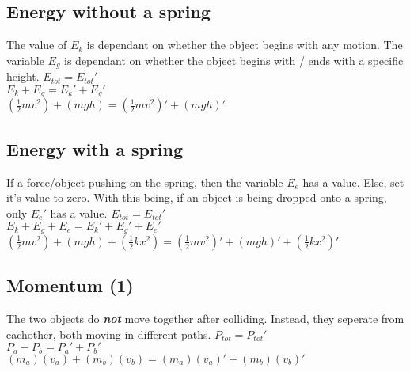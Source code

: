 \begin{adjustwidth}{1cm}{0pt}
    \subsection{Energy without a spring}
    \begin{flushleft}
        The value of $E_{k}$ is dependant on whether the object begins with any motion. The variable $E_{g}$ is dependant on whether the object begins with / ends with a specific height.\newline\newline
        $E_{tot} = E_{tot}\prime$ \\
        \vspace*{10pt}
        $E_{k} + E_{g} = E_{k}\prime + E_{g}\prime$ \\
        \vspace*{10pt}
        $(\frac{1}{2}mv^2) + (mgh) = (\frac{1}{2}mv^2)\prime + (mgh)\prime$
    \end{flushleft}
    \subsection{Energy with a spring}
    \begin{flushleft}
        If a force/object pushing on the spring, then the variable $E_{e}$ has a value. Else, set it's value to zero. With this being, if an object is being dropped onto a spring, only $E_{e}\prime$ has a value.\newline\newline
        $E_{tot} = E_{tot}\prime$ \\
        \vspace*{10pt}
        $E_{k} + E_{g} + E_{e} = E_{k}\prime + E_{g}\prime + E_{e}\prime$ \\
        \vspace*{10pt}
        $(\frac{1}{2}mv^2) + (mgh) + (\frac{1}{2}kx^2) = (\frac{1}{2}mv^2)\prime + (mgh)\prime + (\frac{1}{2}kx^2)\prime$
    \end{flushleft}
    \subsection{Momentum (1)}
    \begin{flushleft}
        The two objects do \textbf{\textit{not}} move together after colliding. Instead, they seperate from eachother, both moving in different paths.\newline\newline
        $P_{tot} = P_{tot}\prime$ \\
        \vspace*{10pt}
        $P_{a} + P_{b} = P_{a}\prime + P_{b}\prime$ \\
        \vspace*{10pt}
        $(m_{a})(v_{a}) + (m_{b})(v_{b}) = (m_{a})(v_{a})\prime + (m_{b})(v_{b})\prime$
    \end{flushleft}
    \vspace*{0.03cm}

\end{adjustwidth}
